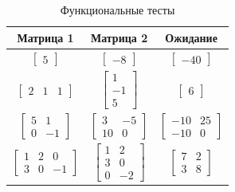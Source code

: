 \documentclass[12pt, a4paper]{report}
\begin{document}
	\begin{table}[ht!]
		\caption{Функциональные тесты}
		\label{unit-tests}
		\begin{center}
			\begin{tabular}{|c|c|c|}
			\hline
			\bf{Матрица 1} & \bf{Матрица 2} & \bf{Ожидание}\\\hline
			
			$\begin{bmatrix}5\end{bmatrix}$ &
			$\begin{bmatrix}-8\end{bmatrix}$ &
			$\begin{bmatrix}-40\end{bmatrix}$\\\hline
			
			$\begin{bmatrix}2 & 1 & 1\end{bmatrix}$ &
			$\begin{bmatrix}1\\-1\\5\end{bmatrix}$ &
			$\begin{bmatrix}6\end{bmatrix}$\\\hline
			
			$\begin{bmatrix}5 & 1\\0 & -1\end{bmatrix}$ &
			$\begin{bmatrix}3 & -5\\10 & 0\end{bmatrix}$ &
			$\begin{bmatrix}-10 & 25\\-10 & 0\end{bmatrix}$\\\hline
			
			$\begin{bmatrix}1 & 2 & 0\\3 & 0 & -1\end{bmatrix}$ &
			$\begin{bmatrix}1 & 2\\3 & 0\\0 & -2\end{bmatrix}$ &
			$\begin{bmatrix}7 & 2\\3 & 8\end{bmatrix}$\\\hline
			

\end{tabular}
\end{center}
\end{table}
\end{document}
